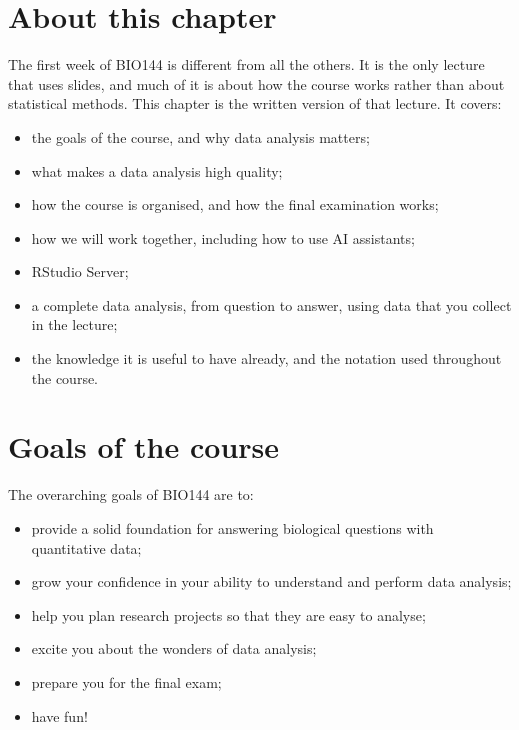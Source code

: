 \documentclass[
  letterpaper,
  8pt,
  a4paper]{book}
\providecommand{\tightlist}{%
  \setlength{\itemsep}{0pt}\setlength{\parskip}{0pt}}
\begin{document}
\section*{About this chapter}\label{about-this-chapter}


The first week of BIO144 is different from all the others. It is the
only lecture that uses slides, and much of it is about how the course
works rather than about statistical methods. This chapter is the written
version of that lecture. It covers:

\begin{itemize}
\tightlist
\item
  the goals of the course, and why data analysis matters;
\item
  what makes a data analysis high quality;
\item
  how the course is organised, and how the final examination works;
\item
  how we will work together, including how to use AI assistants;
\item
  RStudio Server;
\item
  a complete data analysis, from question to answer, using data that you
  collect in the lecture;
\item
  the knowledge it is useful to have already, and the notation used
  throughout the course.
\end{itemize}

\section*{Goals of the course}\label{goals-of-the-course}


The overarching goals of BIO144 are to:

\begin{itemize}
\tightlist
\item
  provide a solid foundation for answering biological questions with
  quantitative data;
\item
  grow your confidence in your ability to understand and perform data
  analysis;
\item
  help you plan research projects so that they are easy to analyse;
\item
  excite you about the wonders of data analysis;
\item
  prepare you for the final exam;
\item
  have fun!
\end{itemize}
\end{document}
